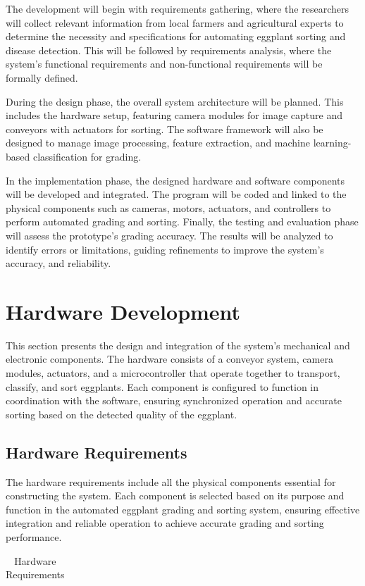 {The development will begin with requirements gathering, where the researchers will collect relevant information from local farmers and agricultural experts to determine the necessity and specifications for automating eggplant sorting and disease detection.  This will be followed by requirements analysis, where the system’s functional requirements and non-functional requirements will be formally defined.

During the design phase, the overall system architecture will be planned. This includes the hardware setup, featuring camera modules for image capture and conveyors with actuators for sorting. The software framework will also be designed to manage image processing, feature extraction, and machine learning-based classification for grading.

In the implementation phase, the designed hardware and software components will be developed and integrated. The program will be coded and linked to the physical components such as cameras, motors, actuators, and controllers to perform automated grading and sorting. Finally, the testing and evaluation phase will assess the prototype's grading accuracy. The results will be analyzed to identify errors or limitations, guiding refinements to improve the system’s accuracy, and reliability.

\section{Hardware Development}
This section presents the design and integration of the system’s mechanical and electronic components. The hardware consists of a conveyor system, camera modules, actuators, and a microcontroller that operate together to transport, classify, and sort eggplants. Each component is configured to function in coordination with the software, ensuring synchronized operation and accurate sorting based on the detected quality of the eggplant. 

\subsection{Hardware Requirements}
The hardware requirements include all the physical components essential for constructing the system. Each component is selected based on its purpose and function in the automated eggplant grading and sorting system, ensuring effective integration and reliable operation to achieve accurate grading and sorting performance.

\begin{longtable}{
		>{\centering\arraybackslash}m{3cm}  
		>{\centering\arraybackslash}m{4cm} 
		>{\arraybackslash}m{6cm}
	}
	\caption{Hardware Requirements} \label{tab:hardwarerequirements} \\
	\toprule
	\multicolumn{1}{c}{\textbf{Component}} &
	\multicolumn{1}{c}{\textbf{Image}} &
	\multicolumn{1}{c}{\textbf{Function}} \\
	\midrule
	

\end{longtable}}
